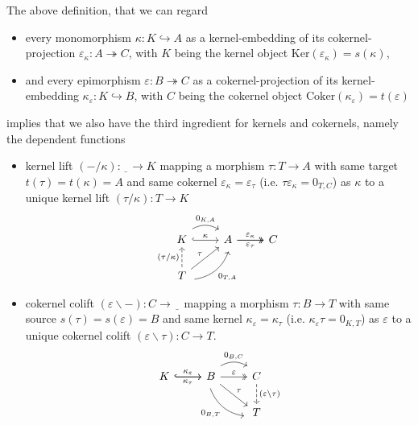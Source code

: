 \begin{remark}
The above definition, that we can regard
\begin{itemize}
\item every monomorphism $\kappa : K \hookrightarrow A$ as a kernel-embedding
of its cokernel-projection $\varepsilon_{\kappa} : A \twoheadrightarrow C$, with $K$ being the kernel object
$\mathrm{Ker}(\varepsilon_{\kappa}) = s(\kappa)$,
\item and every epimorphism
$\varepsilon : B \twoheadrightarrow C$ as a cokernel-projection of its kernel-embedding $\kappa_{\varepsilon} : K \hookrightarrow B$,
with $C$ being the cokernel object $\mathrm{Coker}(\kappa_{\varepsilon}) = t(\varepsilon)$
\end{itemize}
implies that we also have the third ingredient
for kernels and cokernels, namely the dependent functions
\begin{itemize}
\item kernel lift $(-/\kappa) : \underline{\phantom{T}} \rightarrow K$ mapping a morphism $\tau : T \rightarrow A$ with same
target $t(\tau) = t(\kappa) = A$ and same cokernel $\varepsilon_{\kappa} = \varepsilon_{\tau}$ (i.e. $\tau\varepsilon_{\kappa} = 0_{T,C}$)
as $\kappa$ to a unique kernel lift $(\tau / \kappa) : T \rightarrow K$
\[
\begin{tikzcd}
K \arrow[r, "\kappa", hook] \arrow[r, "{0_{K,A}}", bend left, shift left=2]                                & A \arrow[r, "\varepsilon_{\kappa}", two heads] \arrow[r, "\varepsilon_{\tau}"', two heads] & C \\
T \arrow[ru, "{0_{T,A}}"', bend right, shift right=2] \arrow[ru, "\tau"] \arrow[u, "(\tau/\kappa)", dashed] &                                                                                            &  
\end{tikzcd}
\]
\item cokernel colift $(\varepsilon \backslash - ) : C \rightarrow \underline{\phantom{T}}$ mapping a morphism $\tau : B \rightarrow T$ with
same source $s(\tau) = s(\varepsilon) = B$ and same kernel $\kappa_{\varepsilon} = \kappa_{\tau}$
(i.e. $\kappa_{\varepsilon}\tau = 0_{K,T}$)  as $\varepsilon$ to a unique cokernel
colift $(\varepsilon \backslash \tau) : C \rightarrow T$.
\[
\begin{tikzcd}
K \arrow[r, "\kappa_{\varepsilon}", hook] \arrow[r, "\kappa_{\tau}"', hook] & B \arrow[r, "\varepsilon", two heads] \arrow[r, "{0_{B,C}}", bend left, shift left=2] \arrow[rd, "\tau"] \arrow[rd, "{0_{B,T}}"', bend right, shift right=2] & C \arrow[d, "(\varepsilon\backslash\tau)", dashed] \\
                                                                            &                                                                                                                                                   & T                                                 
\end{tikzcd}
\]
\end{itemize}
\end{remark}

